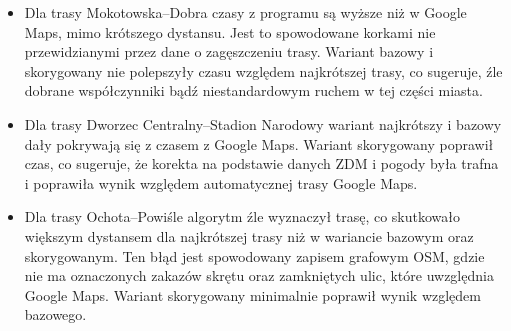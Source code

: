 \documentclass[12pt]{article}
\begin{document}
\begin{table}[H]
    \centering
    \small
    \caption{Porównanie czasu i dystansu z Google Maps (19:00--19:30)}
    \label{tab:route-compare-google}
\end{table}

\begin{itemize}
    \item Dla trasy Mokotowska--Dobra czasy z programu są wyższe niż w Google Maps,
    mimo krótszego dystansu. Jest to spowodowane korkami nie przewidzianymi przez dane o zagęszczeniu trasy.
    Wariant bazowy i skorygowany nie polepszyły czasu względem najkrótszej trasy, co sugeruje, źle dobrane współczynniki bądź niestandardowym ruchem w tej części miasta.
    \item Dla trasy Dworzec Centralny--Stadion Narodowy wariant najkrótszy i bazowy dały pokrywają się z czasem z Google Maps. Wariant skorygowany poprawił czas, co sugeruje, że korekta na podstawie danych ZDM i pogody była trafna
    i poprawiła wynik względem automatycznej trasy Google Maps.
    \item Dla trasy Ochota--Powiśle algorytm źle wyznaczył trasę, co skutkowało większym dystansem dla najkrótszej trasy niż w wariancie bazowym oraz skorygowanym.
    Ten błąd jest spowodowany zapisem grafowym OSM, gdzie nie ma oznaczonych zakazów skrętu oraz zamkniętych ulic, które uwzględnia Google Maps.
    Wariant skorygowany minimalnie poprawił wynik względem bazowego. 
\end{itemize}
\end{document}
